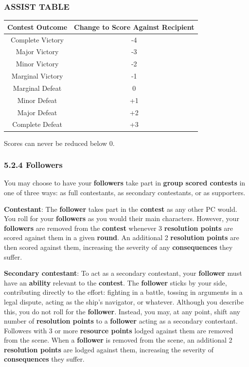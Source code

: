 \documentclass[
]{article}
\begin{document}
\hypertarget{assist-table}{%
\subsubsection{ASSIST TABLE}\label{assist-table}}

\begin{longtable}[]{@{}cc@{}}
\toprule
Contest Outcome & Change to Score Against Recipient\tabularnewline
\midrule
\endhead
Complete Victory & -4\tabularnewline
Major Victory & -3\tabularnewline
Minor Victory & -2\tabularnewline
Marginal Victory & -1\tabularnewline
Marginal Defeat & 0\tabularnewline
Minor Defeat & +1\tabularnewline
Major Defeat & +2\tabularnewline
Complete Defeat & +3\tabularnewline
\bottomrule
\end{longtable}

Scores can never be reduced below 0.

\hypertarget{followers}{%
\subsubsection{5.2.4 Followers}\label{followers}}

You may choose to have your \textbf{followers} take part in
\textbf{group scored contests} in one of three ways: as full
contestants, as secondary contestants, or as supporters.

\textbf{Contestant}: The \textbf{follower} takes part in the
\textbf{contest} as any other PC would. You roll for your
\textbf{followers} as you would their main characters. However, your
\textbf{followers} are removed from the \textbf{contest} whenever 3
\textbf{resolution points} are scored against them in a given
\textbf{round}. An additional 2 \textbf{resolution points} are then
scored against them, increasing the severity of any
\textbf{consequences} they suffer.

\textbf{Secondary contestant}: To act as a secondary contestant, your
\textbf{follower} must have an \textbf{ability} relevant to the
\textbf{contest}. The \textbf{follower} sticks by your side,
contributing directly to the effort: fighting in a battle, tossing in
arguments in a legal dispute, acting as the ship's navigator, or
whatever. Although you describe this, you do not roll for the
\textbf{follower}. Instead, you may, at any point, shift any number of
\textbf{resolution points} to a \textbf{follower} acting as a secondary
contestant. Followers with 3 or more \textbf{resource points} lodged
against them are removed from the scene. When a \textbf{follower} is
removed from the scene, an additional 2 \textbf{resolution points} are
lodged against them, increasing the severity of \textbf{consequences}
they suffer.
\end{document}

